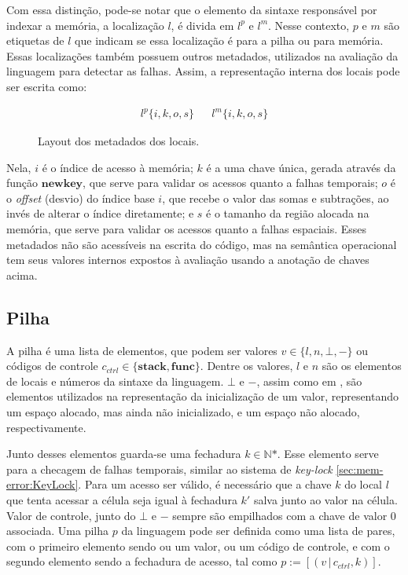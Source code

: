 Com essa distinção, pode-se notar que o elemento da sintaxe responsável por indexar a memória, a localização $l$, é divida em $l^p$ e $l^m$. Nesse contexto, $p$ e $m$ são etiquetas de $l$ que indicam se essa localização é para a pilha ou para memória. Essas localizações também possuem outros metadados, utilizados na avaliação da linguagem para detectar as falhas. Assim, a representação interna dos locais pode ser escrita como:
\begin{figure*}[ht]
	\begin{align*}
		l^p\{i, k, o, s \} && l^m\{i, k, o, s \}
	\end{align*}
	\caption{Layout dos metadados dos locais.}
	\label{fig:ptr:metada}
\end{figure*}

Nela, $i$ é o índice de acesso à memória; $k$ é a uma chave única, gerada através da função $\mathbf{newkey}$, que serve para validar os acessos quanto a falhas temporais; $o$ é o \emph{offset} (desvio) do índice base $i$, que recebe o valor das somas e subtrações, ao invés de alterar o índice diretamente; e $s$ é o tamanho da região alocada na memória, que serve para validar os acessos quanto a falhas espaciais. Esses metadados não são acessíveis na escrita do código, mas na semântica operacional tem seus valores internos expostos à avaliação usando a anotação de chaves acima.

\subsection{Pilha}
\label{sec:pcl-back:pilha}

A pilha é uma lista de elementos, que podem ser valores $v \in \{l, n, \bot, -\}$ ou códigos de controle $c_{ctrl} \in \{\mathbf{stack},\mathbf{func}\}$. Dentre os valores, $l$ e $n$ são os elementos de locais e números da sintaxe da linguagem. $\bot$ e $-$, assim como em \citet{WESSEL2019}, são elementos utilizados na representação da inicialização de um valor, representando um espaço alocado, mas ainda não inicializado, e um espaço não alocado, respectivamente. 

Junto desses elementos guarda-se uma fechadura $k \in \mathbb{N}\text{*}$. Esse elemento serve para a checagem de falhas temporais, similar ao sistema de \emph{key-lock} \ref{sec:mem-error:KeyLock}. Para um acesso ser válido, é necessário que a chave $k$ do local $l$ que tenta acessar a célula seja igual à fechadura $k'$ salva junto ao valor na célula. Valor de controle, junto do $\bot$ e $-$ sempre são empilhados com a chave de valor 0 associada. Uma pilha $p$ da linguagem pode ser definida como uma lista de pares, com o primeiro elemento sendo ou um valor, ou um código de controle, e com o segundo elemento sendo a fechadura de acesso, tal como $p := [(v\,|\,c_{ctrl}, k)]$.

